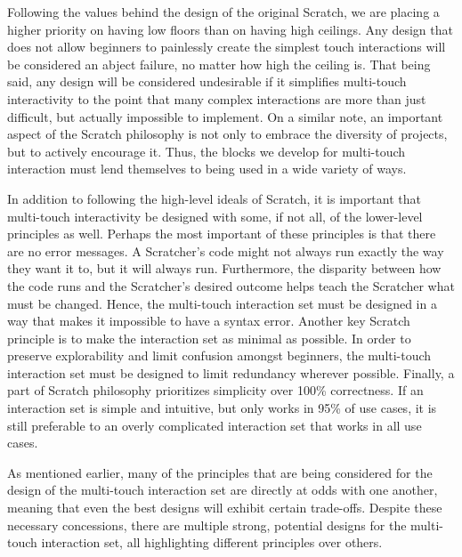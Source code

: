 Following the values behind the design of the original Scratch, we are placing a higher priority on having low floors than on having high ceilings. Any design that does not allow beginners to painlessly create the simplest touch interactions will be considered an abject failure, no matter how high the ceiling is. That being said, any design will be considered undesirable if it simplifies multi-touch interactivity to the point that many complex interactions are more than just difficult, but actually impossible to implement. On a similar note, an important aspect of the Scratch philosophy is not only to embrace the diversity of projects, but to actively encourage it. Thus, the blocks we develop for multi-touch interaction must lend themselves to being used in a wide variety of ways.

In addition to following the high-level ideals of Scratch, it is important that multi-touch interactivity be designed with some, if not all, of the lower-level principles as well. Perhaps the most important of these principles is that there are no error messages. A Scratcher's code might not always run exactly the way they want it to, but it will always run. Furthermore, the disparity between how the code runs and the Scratcher's desired outcome helps teach the Scratcher what must be changed. Hence, the multi-touch interaction set must be designed in a way that makes it impossible to have a syntax error. Another key Scratch principle is to make the interaction set as minimal as possible. In order to preserve explorability and limit confusion amongst beginners, the multi-touch interaction set must be designed to limit redundancy wherever possible. Finally, a part of Scratch philosophy prioritizes simplicity over 100\% correctness. If an interaction set is simple and intuitive, but only works in 95\% of use cases, it is still preferable to an overly complicated interaction set that works in all use cases.

As mentioned earlier, many of the principles that are being considered for the design of the multi-touch interaction set are directly at odds with one another, meaning that even the best designs will exhibit certain trade-offs. Despite these necessary concessions, there are multiple strong, potential designs for the multi-touch interaction set, all highlighting different principles over others.
